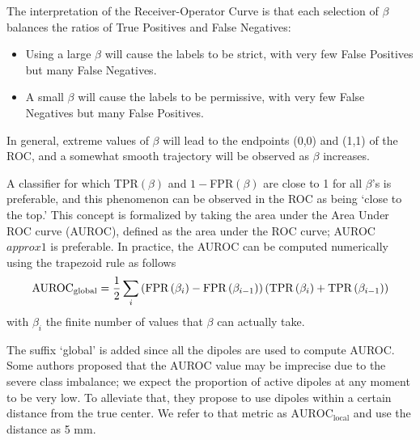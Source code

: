 The interpretation of the Receiver-Operator Curve is that each selection of $\beta$ balances the ratios of True Positives and False Negatives:
\begin{itemize}
\item 
Using a large $\beta$ will cause the labels to be strict, with very few False Positives but many False Negatives.
\item
A small $\beta$ will cause the labels to be permissive, with very few False Negatives but many False Positives.
\end{itemize}
In general, extreme values of $\beta$ will lead to the endpoints (0,0) and (1,1) of the ROC, and a somewhat smooth trajectory will be observed as $\beta$ increases.

A classifier for which TPR$(\beta)$ and $1-$FPR$(\beta)$ are close to 1 for all $\beta$'s is preferable, and this phenomenon can be observed in the ROC as being `close to the top.'
%
This concept is formalized by taking the area under the Area Under ROC curve (AUROC), defined as the area under the ROC curve; AUROC$approx 1$ is preferable.
%
In practice, the AUROC can be computed numerically using the trapezoid rule as follows
\begin{equation}
\text{AUROC}_\text{global} =
\frac{1}{2}
\sum_{i}
\left(  \text{FPR}\left( \beta_i \right)-\text{FPR}\left( \beta_{i-1} \right)  \right)
\left(  \text{TPR}\left( \beta_i \right)+\text{TPR}\left( \beta_{i-1} \right)  \right)
\end{equation}
with $\beta_i$ the finite number of values that $\beta$ can actually take.

The suffix `global' is added since all the dipoles are used to compute AUROC.
%
Some authors proposed that the AUROC value may be imprecise due to the severe class imbalance; we expect the proportion of active dipoles at any moment to be very low.
%
To alleviate that, they propose to use dipoles within a certain distance from the true center.
%
We refer to that metric as $\text{AUROC}_\text{local}$ and use the distance as 5 \si{mm}.

